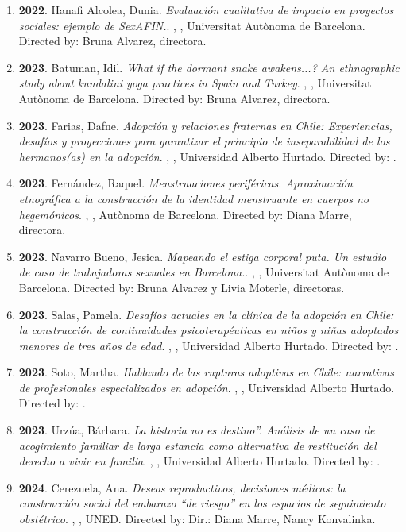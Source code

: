 \begin{enumerate}
\item {\bf 2022}. Hanafi Alcolea, Dunia. {\it Evaluación cualitativa de impacto en proyectos sociales: ejemplo de SexAFIN.}. , , Universitat Autònoma de Barcelona. Directed by: Bruna Alvarez, directora.\filbreak
\item {\bf 2023}. Batuman, Idil. {\it What if the dormant snake awakens...? An ethnographic study about kundalini yoga practices in Spain and Turkey}. , , Universitat Autònoma de Barcelona. Directed by: Bruna Alvarez, directora.\filbreak
\item {\bf 2023}. Farias, Dafne. {\it Adopción y relaciones fraternas en Chile: Experiencias, desafíos y proyecciones para garantizar el principio de inseparabilidad de los hermanos(as) en la adopción}. , , Universidad Alberto Hurtado. Directed by: .\filbreak
\item {\bf 2023}. Fernández, Raquel. {\it Menstruaciones periféricas. Aproximación etnográfica a la construcción de la identidad menstruante en cuerpos no hegemónicos}. , , Autònoma de Barcelona. Directed by: Diana Marre, directora.\filbreak
\item {\bf 2023}. Navarro Bueno, Jesica. {\it Mapeando el estiga corporal puta. Un estudio de caso de trabajadoras sexuales en Barcelona.}. , , Universitat Autònoma de Barcelona. Directed by: Bruna Alvarez y Livia Moterle, directoras.\filbreak
\item {\bf 2023}. Salas, Pamela. {\it Desafíos actuales en la clínica de la adopción en Chile: la construcción de continuidades psicoterapéuticas en niños y niñas adoptados menores de tres años de edad}. , , Universidad Alberto Hurtado. Directed by: .\filbreak
\item {\bf 2023}. Soto, Martha. {\it Hablando de las rupturas adoptivas en Chile: narrativas de profesionales especializados en adopción}. , , Universidad Alberto Hurtado. Directed by: .\filbreak
\item {\bf 2023}. Urzúa, Bárbara. {\it La historia no es destino”. Análisis de un caso de acogimiento familiar de larga estancia como alternativa de restitución del derecho a vivir en familia}. , , Universidad Alberto Hurtado. Directed by: .\filbreak
\item {\bf 2024}. Cerezuela, Ana. {\it Deseos reproductivos, decisiones médicas: la construcción social del embarazo “de riesgo” en los espacios de seguimiento obstétrico}. , , UNED. Directed by: Dir.: Diana Marre, Nancy Konvalinka.\filbreak
\end{enumerate} 
